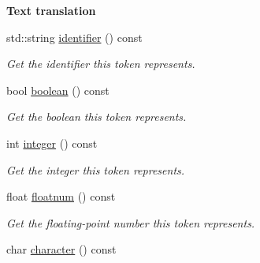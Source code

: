 \begin{Indent}{\bf Text translation}\par
\begin{DoxyCompactItemize}
\item 
std\+::string \hyperlink{classcreek_1_1_token_aceb57c53ccbf083b958a55f5252d3d41}{identifier} () const \hypertarget{classcreek_1_1_token_aceb57c53ccbf083b958a55f5252d3d41}{}\label{classcreek_1_1_token_aceb57c53ccbf083b958a55f5252d3d41}

\begin{DoxyCompactList}\small\item\em Get the identifier this token represents. \end{DoxyCompactList}\item 
bool \hyperlink{classcreek_1_1_token_ac80a8a60201fb03bf38d2f91b2b305f5}{boolean} () const \hypertarget{classcreek_1_1_token_ac80a8a60201fb03bf38d2f91b2b305f5}{}\label{classcreek_1_1_token_ac80a8a60201fb03bf38d2f91b2b305f5}

\begin{DoxyCompactList}\small\item\em Get the boolean this token represents. \end{DoxyCompactList}\item 
int \hyperlink{classcreek_1_1_token_ad362f2b190c7c0df69fc1b652e19d123}{integer} () const \hypertarget{classcreek_1_1_token_ad362f2b190c7c0df69fc1b652e19d123}{}\label{classcreek_1_1_token_ad362f2b190c7c0df69fc1b652e19d123}

\begin{DoxyCompactList}\small\item\em Get the integer this token represents. \end{DoxyCompactList}\item 
float \hyperlink{classcreek_1_1_token_ab6f426aaef285a3e1d863b4572617caf}{floatnum} () const \hypertarget{classcreek_1_1_token_ab6f426aaef285a3e1d863b4572617caf}{}\label{classcreek_1_1_token_ab6f426aaef285a3e1d863b4572617caf}

\begin{DoxyCompactList}\small\item\em Get the floating-\/point number this token represents. \end{DoxyCompactList}\item 
char \hyperlink{classcreek_1_1_token_a0914dd73f7dbc94d6c316bb4464ba288}{character} () const \hypertarget{classcreek_1_1_token_a0914dd73f7dbc94d6c316bb4464ba288}{}\label{classcreek_1_1_token_a0914dd73f7dbc94d6c316bb4464ba288}


\end{DoxyCompactItemize}
\end{Indent}
